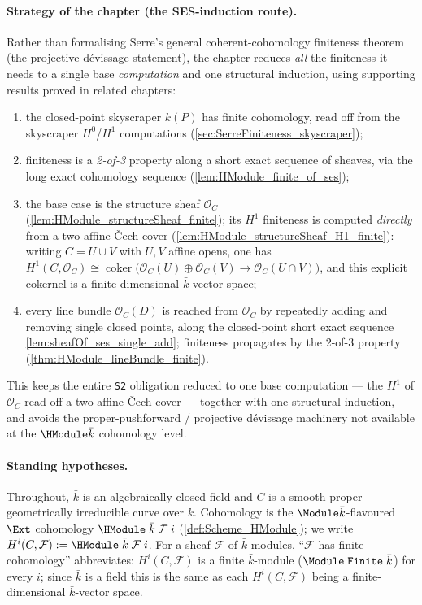 \paragraph{Strategy of the chapter (the SES-induction route).} Rather
than formalising Serre's general coherent-cohomology finiteness theorem
(the projective-dévissage statement), the chapter reduces \emph{all} the
finiteness it needs to a single base \emph{computation} and one
structural induction, using supporting results proved in related
chapters:
\begin{enumerate}
  \item the closed-point skyscraper \(k(P)\) has finite cohomology,
    read off from the skyscraper \(H^0\)/\(H^1\) computations
    (\cref{sec:SerreFiniteness_skyscraper});
  \item finiteness is a \emph{2-of-3} property along a short exact
    sequence of sheaves, via the long exact cohomology sequence
    (\cref{lem:HModule_finite_of_ses});
  \item the base case is the structure sheaf \(\mathcal O_C\)
    (\cref{lem:HModule_structureSheaf_finite}); its \(H^1\) finiteness
    is computed \emph{directly} from a two-affine Čech cover
    (\cref{lem:HModule_structureSheaf_H1_finite}): writing
    \(C = U \cup V\) with \(U, V\) affine opens, one has
    \(H^1(C, \mathcal O_C) \cong
    \operatorname{coker}\bigl(\mathcal O_C(U) \oplus \mathcal O_C(V)
    \to \mathcal O_C(U \cap V)\bigr)\), and this explicit cokernel is a
    finite-dimensional \(\bar k\)-vector space;
  \item every line bundle \(\mathcal O_C(D)\) is reached from
    \(\mathcal O_C\) by repeatedly adding and removing single closed
    points, along the closed-point short exact sequence
    \cref{lem:sheafOf_ses_single_add}; finiteness propagates by the
    2-of-3 property (\cref{thm:HModule_lineBundle_finite}).
\end{enumerate}
This keeps the entire \texttt{S2} obligation reduced to one base
computation --- the \(H^1\) of \(\mathcal O_C\) read off a two-affine
Čech cover --- together with one structural induction, and avoids the
proper-pushforward / projective dévissage machinery not available at the
\(\HModule \bar k\) cohomology level.

\paragraph{Standing hypotheses.} Throughout, \(\bar k\) is an
algebraically closed field and \(C\) is a smooth proper geometrically
irreducible curve over \(\bar k\).
Cohomology is the \(\Module \bar k\)-flavoured \(\Ext\)
cohomology \(\HModule\;\bar k\;\mathcal F\;i\)
(\cref{def:Scheme_HModule}); we write
\(H^i(C, \mathcal F) := \HModule\;\bar k\;\mathcal F\;i\). For a sheaf
\(\mathcal F\) of \(\bar k\)-modules, ``\(\mathcal F\) has finite
cohomology'' abbreviates: \(H^i(C, \mathcal F)\) is a finite
\(\bar k\)-module (\(\Module.\mathtt{Finite}\;\bar k\)) for every
\(i\); since \(\bar k\) is a field this is the same as each
\(H^i(C, \mathcal F)\) being a finite-dimensional \(\bar k\)-vector
space.


